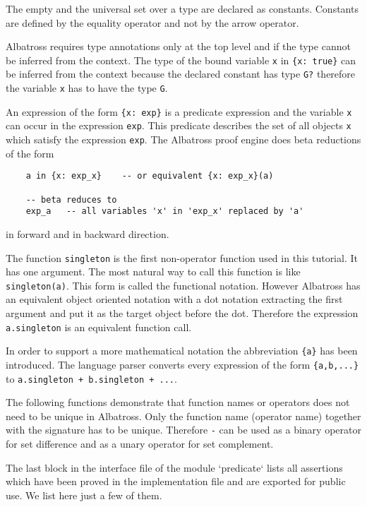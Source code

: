 The empty and the universal set over a type are declared as
constants. Constants are defined by the equality operator and not by the arrow
operator.

Albatross requires type annotations only at the top level and if the type
cannot be inferred from the context. The type of the bound variable
\lstinline!x! in \lstinline!{x: true}! can be inferred from the context
because the declared constant has type \lstinline!G?! therefore the variable
\lstinline!x! has to have the type \lstinline!G!.

An expression of the form \lstinline!{x: exp}! is a predicate expression and
the variable \lstinline!x! can occur in the expression \lstinline!exp!. This
predicate describes the set of all objects \lstinline!x! which satisfy the
expression \lstinline!exp!. The Albatross proof engine does beta reductions of
the form
\begin{lstlisting}
    a in {x: exp_x}    -- or equivalent {x: exp_x}(a)

    -- beta reduces to
    exp_a   -- all variables 'x' in 'exp_x' replaced by 'a'
\end{lstlisting}
in forward and in backward direction.

The function \lstinline!singleton! is the first non-operator function used in
this tutorial. It has one argument. The most natural way to call this function
is like \lstinline!singleton(a)!. This form is called the functional
notation. However Albatross has an equivalent object oriented notation with a
dot notation extracting the first argument and put it as the target object
before the dot. Therefore the expression \lstinline!a.singleton! is an
equivalent function call.

In order to support a more mathematical notation the abbreviation
\lstinline!{a}! has been introduced. The language parser converts every
expression of the form \lstinline!{a,b,...}! to
\lstinline!a.singleton + b.singleton + ...!.

The following functions demonstrate that function names or operators does not
need to be unique in Albatross. Only the function name (operator name)
together with the signature has to be unique. Therefore \lstinline!-! can be
used as a binary operator for set difference and as a unary operator for set
complement.

The last block in the interface file of the module `predicate` lists all
assertions which have been proved in the implementation file and are exported
for public use. We list here just a few of them.

